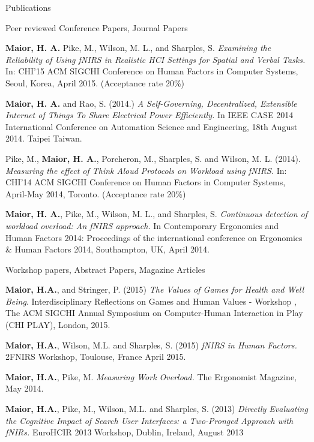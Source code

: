 \documentclass{resume} %
\begin{document}
\begin{rSection}{Publications}
\begin{rSubsection}{ }{ }{ }{Peer reviewed Conference Papers, Journal Papers}
\item \textbf{Maior, H. A.} Pike, M., Wilson, M. L., and Sharples, S. \emph{Examining the Reliability of Using fNIRS in Realistic HCI Settings for Spatial and Verbal Tasks.} In: CHI'15 ACM SIGCHI Conference on Human Factors in Computer Systems, Seoul, Korea, April 2015. (Acceptance rate 20\%)

\item \textbf{Maior, H. A.} and Rao, S. (2014.) \emph{A Self-Governing, Decentralized, Extensible Internet of Things To Share Electrical Power Efficiently.} In IEEE CASE 2014 International Conference on Automation Science and Engineering, 18th August 2014. Taipei Taiwan.

\item Pike, M., \textbf{Maior, H. A.}, Porcheron, M., Sharples, S. and Wilson, M. L. (2014). \emph{Measuring the effect of Think Aloud Protocols on Workload using fNIRS.} In: CHI'14 ACM SIGCHI Conference on Human Factors in Computer Systems, April-May 2014, Toronto. (Acceptance rate 20\%)

\item \textbf{Maior, H. A.}, Pike, M., Wilson, M. L., and Sharples, S. \emph{Continuous detection of workload overload: An fNIRS approach.} In Contemporary Ergonomics and Human Factors 2014: Proceedings of the international conference on Ergonomics \& Human Factors 2014, Southampton, UK, April 2014.
\end{rSubsection}

\begin{rSubsection}{ }{ }{ }{Workshop papers, Abstract Papers, Magazine Articles}
    \item \textbf{Maior, H.A.}, and Stringer, P. (2015) \emph{The Values of Games for Health and Well Being}. Interdisciplinary Reflections on Games and Human Values - Workshop , The ACM SIGCHI Annual Symposium on Computer-Human Interaction in Play (CHI PLAY), London, 2015.
    \item \textbf{Maior, H.A.}, Wilson, M.L. and Sharples, S. (2015) \emph{fNIRS in Human Factors.} 2FNIRS Workshop, Toulouse, France April 2015.
    \item \textbf{Maior, H.A.}, Pike, M. \emph{Measuring Work Overload.} The Ergonomist Magazine, May 2014.
    \item \textbf{Maior, H.A.}, Pike, M., Wilson, M.L. and Sharples, S. (2013) \emph{Directly Evaluating the Cognitive Impact of Search User Interfaces: a Two-Pronged Approach with fNIRs.} EuroHCIR 2013 Workshop, Dublin, Ireland, August 2013
\end{rSubsection}

\end{rSection}
\end{document}
